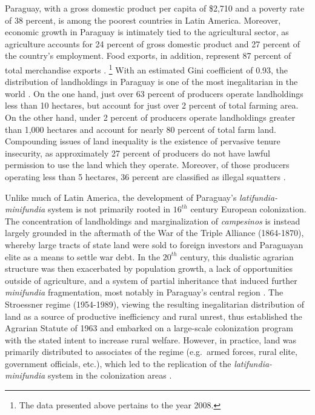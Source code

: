 \documentclass[english]{article}
\begin{document}
Paraguay, with a gross domestic product per capita of \$2,710 and a poverty 
rate of 38 percent, is among the poorest countries in Latin America. 
Moreover, economic growth in Paraguay is intimately tied to the agricultural 
sector, as agriculture accounts for 24 percent of gross domestic product and 
27 percent of the country's employment. 
Food exports, in addition, represent 87 percent of total merchandise exports 
\citep{wdi2012}.%
\footnote{The data presented above pertains to the year 2008.} 
With an estimated Gini coefficient of 0.93, the distribution of landholdings in 
Paraguay is one of the most inegalitarian in the world \citep{lipton2009}. 
On the one hand, just over 63 percent of producers operate landholdings less 
than 10 hectares, but account for just over 2 percent of total farming area.  
On the other hand, under 2 percent of producers operate landholdings 
greater than 1,000 hectares and account for nearly 80 percent of total farm 
land. 
Compounding issues of land inequality is the existence of pervasive tenure 
insecurity, as approximately 27 percent of producers do not have lawful 
permission to use the land which they operate. 
Moreover, of those producers operating less than 5 hectares, 36 percent are 
classified as illegal squatters \citep{mag2012}. 

Unlike much of Latin America, the development of Paraguay's 
\emph{latifundia-minifundia} system is not primarily rooted in $16^{th}$ 
century European colonization.
The concentration of landholdings and marginalization of 
\emph{campesinos} is instead largely grounded in the aftermath of the War 
of the Triple Alliance (1864-1870), whereby large tracts of state land were sold 
to foreign investors and Paraguayan elite as a means to settle war debt.
In the $20^{th}$ century, this dualistic agrarian structure was then exacerbated 
by population growth, a lack of opportunities outside of
agriculture, and a system of partial inheritance that induced further 
\emph{minifundia} fragmentation, most notably in Paraguay's central region
\citep{baer1984, danielsen2009}.
The Stroessner regime (1954-1989), viewing the resulting inegalitarian 
distribution of land as a source of productive inefficiency and rural unrest, 
thus established the Agrarian Statute of 1963 and embarked on a large-scale 
colonization program with the stated intent to increase rural welfare.
However, in practice, land was primarily distributed to associates of the regime
(e.g.\ armed forces, rural elite, government officials, etc.), which led to the 
replication of the \emph{latifundia-minifundia} system in the colonization
areas \citep{weisskoff1992, nagel1999}.
\end{document}
